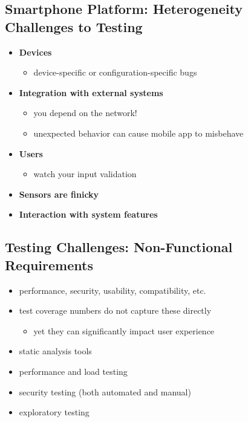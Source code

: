 \subsection{Smartphone Platform: Heterogeneity Challenges to Testing}

\begin{itemize}
  \item \textbf{Devices}
  \begin{itemize}
    \item device-specific or configuration-specific bugs
  \end{itemize}
  \item \textbf{Integration with external systems}
  \begin{itemize}
    \item you depend on the network!
    \item unexpected behavior can cause mobile app to misbehave
  \end{itemize}
  \item \textbf{Users}
  \begin{itemize}
    \item watch your input validation
  \end{itemize}
  \item \textbf{Sensors are finicky}
  \item \textbf{Interaction with system features}
\end{itemize}

\subsection{Testing Challenges: Non-Functional Requirements}

\begin{itemize}
  \item performance, security, usability, compatibility, etc.
  \item test coverage numbers do not capture these directly
  \begin{itemize}
    \item yet they can significantly impact user experience
  \end{itemize}
  \item static analysis tools
  \item performance and load testing
  \item security testing (both automated and manual)
  \item exploratory testing
\end{itemize}

